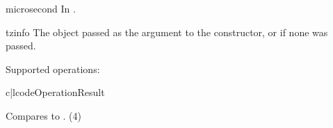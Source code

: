 \begin{memberdesc}{microsecond}
  In .
\end{memberdesc}

\begin{memberdesc}{tzinfo}
  The object passed as the  argument to the
   constructor, or  if none was passed.
\end{memberdesc}

Supported operations:

\begin{tableii}{c|l}{code}{Operation}{Result}



   {Compares  to . 
    (4)}

\end{tableii}

